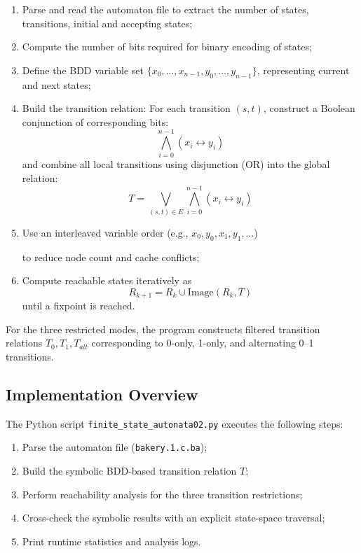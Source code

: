 \documentclass[a4paper,11pt]{article}
\begin{document}
\begin{enumerate}
  \item Parse and read the automaton file to extract the number of states, transitions, initial and accepting states;
  \item Compute the number of bits required for binary encoding of states;
  \item Define the BDD variable set 
        \(\{x_0,\dots,x_{n-1},y_0,\dots,y_{n-1}\}\),
        representing current and next states;
    \item Build the transition relation:
    For each transition $(s,t)$, construct a Boolean conjunction of corresponding bits:
    \[
    \bigwedge_{i=0}^{n-1}(x_i \leftrightarrow y_i)
    \]
    and combine all local transitions using disjunction (OR) into the global relation:
    \[
    T = \bigvee_{(s,t)\in E}\bigwedge_{i=0}^{n-1}(x_i \leftrightarrow y_i)
    \]

  \item Use an interleaved variable order (e.g., \(x_0,y_0,x_1,y_1,\dots\)) 
  
        to reduce node count and cache conflicts;
  \item Compute reachable states iteratively as
  \[
  R_{k+1}=R_k\cup\mathrm{Image}(R_k,T)
  \]
  until a fixpoint is reached.
\end{enumerate}

For the three restricted modes, the program constructs filtered transition relations
\(T_0, T_1, T_{alt}\)
corresponding to 0-only, 1-only, and alternating 0–1 transitions.



\subsection*{Implementation Overview}

The Python script \texttt{finite\_state\_autonata02.py} executes the following steps:

\begin{enumerate}
  \item Parse the automaton file (\texttt{bakery.1.c.ba});
  \item Build the symbolic BDD-based transition relation \(T\);
  \item Perform reachability analysis for the three transition restrictions;
  \item Cross-check the symbolic results with an explicit state-space traversal;
  \item Print runtime statistics and analysis logs.
\end{enumerate}
\end{document}
